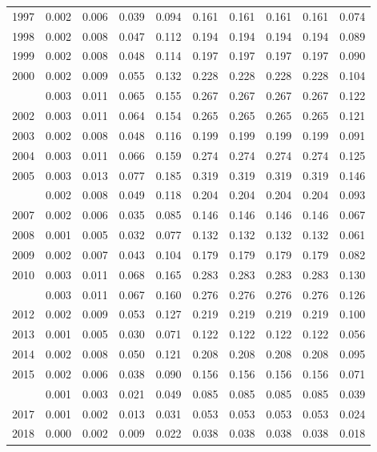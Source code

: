 \documentclass[
]{article}
\begin{document}
\begin{longtable}[t]{lrrrrrrrrr}
1997 & 0.002 & 0.006 & 0.039 & 0.094 & 0.161 & 0.161 & 0.161 & 0.161 & 0.074\\
1998 & 0.002 & 0.008 & 0.047 & 0.112 & 0.194 & 0.194 & 0.194 & 0.194 & 0.089\\
1999 & 0.002 & 0.008 & 0.048 & 0.114 & 0.197 & 0.197 & 0.197 & 0.197 & 0.090\\
2000 & 0.002 & 0.009 & 0.055 & 0.132 & 0.228 & 0.228 & 0.228 & 0.228 & 0.104\\
\addlinespace
2001 & 0.003 & 0.011 & 0.065 & 0.155 & 0.267 & 0.267 & 0.267 & 0.267 & 0.122\\
2002 & 0.003 & 0.011 & 0.064 & 0.154 & 0.265 & 0.265 & 0.265 & 0.265 & 0.121\\
2003 & 0.002 & 0.008 & 0.048 & 0.116 & 0.199 & 0.199 & 0.199 & 0.199 & 0.091\\
2004 & 0.003 & 0.011 & 0.066 & 0.159 & 0.274 & 0.274 & 0.274 & 0.274 & 0.125\\
2005 & 0.003 & 0.013 & 0.077 & 0.185 & 0.319 & 0.319 & 0.319 & 0.319 & 0.146\\
\addlinespace
2006 & 0.002 & 0.008 & 0.049 & 0.118 & 0.204 & 0.204 & 0.204 & 0.204 & 0.093\\
2007 & 0.002 & 0.006 & 0.035 & 0.085 & 0.146 & 0.146 & 0.146 & 0.146 & 0.067\\
2008 & 0.001 & 0.005 & 0.032 & 0.077 & 0.132 & 0.132 & 0.132 & 0.132 & 0.061\\
2009 & 0.002 & 0.007 & 0.043 & 0.104 & 0.179 & 0.179 & 0.179 & 0.179 & 0.082\\
2010 & 0.003 & 0.011 & 0.068 & 0.165 & 0.283 & 0.283 & 0.283 & 0.283 & 0.130\\
\addlinespace
2011 & 0.003 & 0.011 & 0.067 & 0.160 & 0.276 & 0.276 & 0.276 & 0.276 & 0.126\\
2012 & 0.002 & 0.009 & 0.053 & 0.127 & 0.219 & 0.219 & 0.219 & 0.219 & 0.100\\
2013 & 0.001 & 0.005 & 0.030 & 0.071 & 0.122 & 0.122 & 0.122 & 0.122 & 0.056\\
2014 & 0.002 & 0.008 & 0.050 & 0.121 & 0.208 & 0.208 & 0.208 & 0.208 & 0.095\\
2015 & 0.002 & 0.006 & 0.038 & 0.090 & 0.156 & 0.156 & 0.156 & 0.156 & 0.071\\
\addlinespace
2016 & 0.001 & 0.003 & 0.021 & 0.049 & 0.085 & 0.085 & 0.085 & 0.085 & 0.039\\
2017 & 0.001 & 0.002 & 0.013 & 0.031 & 0.053 & 0.053 & 0.053 & 0.053 & 0.024\\
2018 & 0.000 & 0.002 & 0.009 & 0.022 & 0.038 & 0.038 & 0.038 & 0.038 & 0.018\\*
\end{longtable}
\end{document}
